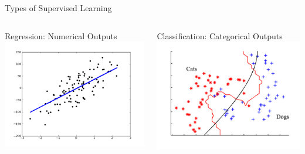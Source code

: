 \documentclass[8pt,aspectratio=169]{beamer}
\begin{document}
\begin{frame}{Types of Supervised Learning}

\begin{columns}[T] %
\begin{column}{.48\textwidth}
\pause
\begin{center}
  Regression: Numerical Outputs
  \includegraphics[scale=0.6]{figures/supervised-regression}
\end{center}
\end{column}

\begin{column}{.48\textwidth}
\pause
\begin{center}
  Classification: Categorical Outputs
  \includegraphics[scale=0.63]{figures/supervised-classification}
\end{center}
\end{column}
\end{columns}

\end{frame}
\end{document}
